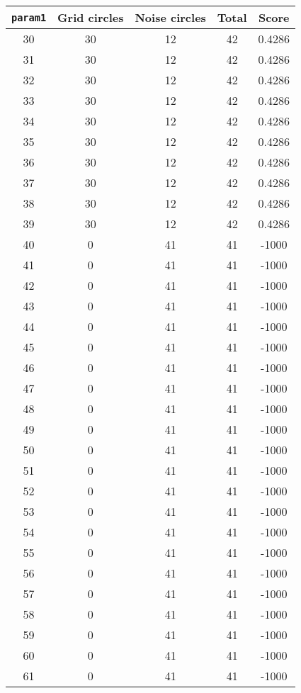 \documentclass[letterpaper, 12pt]{article}
\begin{document}
\begin{longtable}{|c|c|c|c|c|}
\hline
\textbf{\texttt{param1}} & \textbf{Grid circles} & \textbf{Noise circles} & \textbf{Total} & \textbf{Score} \\
\hline
30 & 30 & 12 & 42 & 0.4286 \\
\hline
31 & 30 & 12 & 42 & 0.4286 \\
\hline
32 & 30 & 12 & 42 & 0.4286 \\
\hline
33 & 30 & 12 & 42 & 0.4286 \\
\hline
34 & 30 & 12 & 42 & 0.4286 \\
\hline
35 & 30 & 12 & 42 & 0.4286 \\
\hline
36 & 30 & 12 & 42 & 0.4286 \\
\hline
37 & 30 & 12 & 42 & 0.4286 \\
\hline
38 & 30 & 12 & 42 & 0.4286 \\
\hline
39 & 30 & 12 & 42 & 0.4286 \\
\hline
40 & 0 & 41 & 41 & -1000 \\
\hline
41 & 0 & 41 & 41 & -1000 \\
\hline
42 & 0 & 41 & 41 & -1000 \\
\hline
43 & 0 & 41 & 41 & -1000 \\
\hline
44 & 0 & 41 & 41 & -1000 \\
\hline
45 & 0 & 41 & 41 & -1000 \\
\hline
46 & 0 & 41 & 41 & -1000 \\
\hline
47 & 0 & 41 & 41 & -1000 \\
\hline
48 & 0 & 41 & 41 & -1000 \\
\hline
49 & 0 & 41 & 41 & -1000 \\
\hline
50 & 0 & 41 & 41 & -1000 \\
\hline
51 & 0 & 41 & 41 & -1000 \\
\hline
52 & 0 & 41 & 41 & -1000 \\
\hline
53 & 0 & 41 & 41 & -1000 \\
\hline
54 & 0 & 41 & 41 & -1000 \\
\hline
55 & 0 & 41 & 41 & -1000 \\
\hline
56 & 0 & 41 & 41 & -1000 \\
\hline
57 & 0 & 41 & 41 & -1000 \\
\hline
58 & 0 & 41 & 41 & -1000 \\
\hline
59 & 0 & 41 & 41 & -1000 \\
\hline
60 & 0 & 41 & 41 & -1000 \\
\hline
61 & 0 & 41 & 41 & -1000 \\

\end{longtable}
\end{document}
